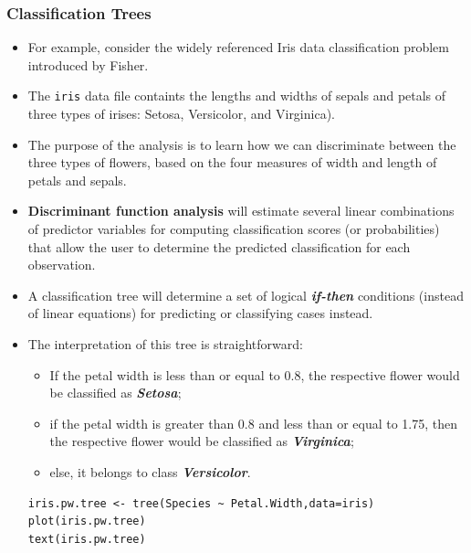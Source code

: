 \documentclass[caret-main.tex]{subfiles}
\begin{document}
\subsubsection{Classification Trees}
\begin{itemize}
\item For example, consider the widely referenced Iris data classification problem introduced by Fisher. 
\item The \texttt{iris} data file containts the lengths and widths of sepals and petals of three types of irises: Setosa, Versicolor, and Virginica). 
\item The purpose of the analysis is to learn how we can discriminate between the three types of flowers, based on the four measures of width and length of petals and sepals. 
\item \textbf{Discriminant function analysis} will estimate several linear combinations of predictor variables for computing classification scores (or probabilities) that allow the user to determine the predicted classification for each observation. 
\item A classification tree will determine a set of logical \textbf{\textit{if-then}} conditions (instead of linear equations) for predicting or classifying cases instead.

\item The interpretation of this tree is straightforward:

\begin{itemize} 
\item If the petal width is less than or equal to 0.8, the respective flower would be classified as \textbf{\textit{Setosa}}; 
\item if the petal width is greater than 0.8 and less than or equal to 1.75, then the respective flower would be classified as \textbf{\textit{Virginica}}; 
\item else, it belongs to class \textbf{\textit{Versicolor}}.
\end{itemize}
\newpage
\begin{framed}
\begin{verbatim}
iris.pw.tree <- tree(Species ~ Petal.Width,data=iris)
plot(iris.pw.tree)
text(iris.pw.tree)

\end{verbatim}
\end{framed}


\end{itemize}
\end{document}
